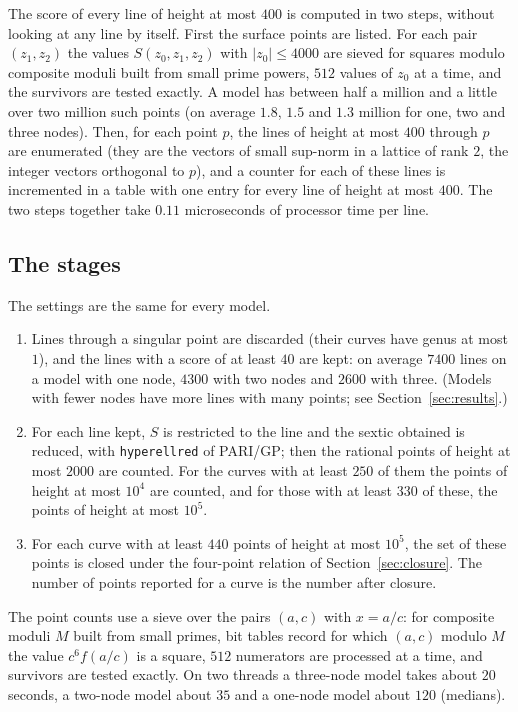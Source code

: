 \documentclass[11pt]{article}
\theoremstyle{remark}
\begin{document}
The score of every line of height at most $400$ is computed in two steps, without looking at any line by itself.  First the surface
points are listed.  For each pair $(z_1,z_2)$ the values $S(z_0,z_1,z_2)$ with $|z_0|\le 4000$ are sieved for squares modulo
composite moduli built from small prime powers, $512$ values of $z_0$ at a time, and the survivors are tested exactly.  A model
has between half a million and a little over two million such points (on average $1.8$, $1.5$ and $1.3$ million for one, two and three
nodes).  Then, for each point $p$, the lines of height at most $400$ through $p$ are enumerated (they are the vectors of small
sup-norm in a lattice of rank $2$, the integer vectors orthogonal to $p$), and a counter for each of these lines is incremented in
a table with one entry for every line of height at most $400$.  The two steps together take $0.11$ microseconds of processor
time per line.

\subsection*{The stages}
The settings are the same for every model.
\begin{enumerate}\itemsep 1pt
\item Lines through a singular point are discarded (their curves have genus at most $1$), and the lines with a score of at least
$40$ are kept: on average $7400$ lines on a model with one node, $4300$ with two nodes and $2600$ with three.
(Models with fewer nodes have more lines with many points; see Section~\ref{sec:results}.)
\item For each line kept, $S$ is restricted to the line and the sextic obtained is reduced, with \texttt{hyperellred} of
PARI/GP; then the rational points of height at most $2000$ are counted.  For the curves with at least $250$ of them the points of
height at most $10^4$ are counted, and for those with at least $330$ of these, the points of height at most $10^5$.
\item For each curve with at least $440$ points of height at most $10^5$, the set of these points is closed under the four-point
relation of Section~\ref{sec:closure}.  The number of points reported for a curve is the number after closure.
\end{enumerate}
The point counts use a sieve over the pairs $(a,c)$ with $x=a/c$: for composite moduli $M$ built from small primes, bit tables
record for which $(a,c)$ modulo $M$ the value $c^6f(a/c)$ is a square, $512$ numerators are processed at a time, and
survivors are tested exactly.  On two threads a three-node model takes about $20$ seconds, a two-node model about
$35$ and a one-node model about $120$ (medians).
\end{document}
